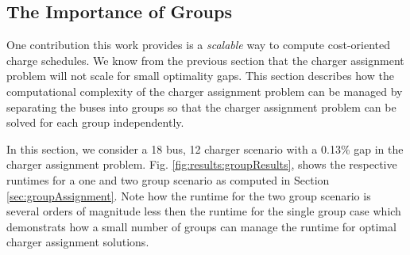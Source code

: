 \subsection{The Importance of Groups}
One contribution this work provides is a {\it scalable} way to compute cost-oriented charge schedules. We know from the previous section that the charger assignment problem will not scale for small optimality gaps. This section describes how the computational complexity of the charger assignment problem can be managed by separating the buses into groups so that the charger assignment problem can be solved for each group independently. 
\par In this section, we consider a 18 bus, 12 charger scenario with a 0.13\% gap in the charger assignment problem. Fig. \ref{fig:results:groupResults}, shows the respective runtimes for a one and two group scenario as computed in Section \ref{sec:groupAssignment}. Note how the runtime for the two group scenario is several orders of magnitude less then the runtime for the single group case which demonstrats how a small number of groups can manage the runtime for optimal charger assignment solutions.
 
